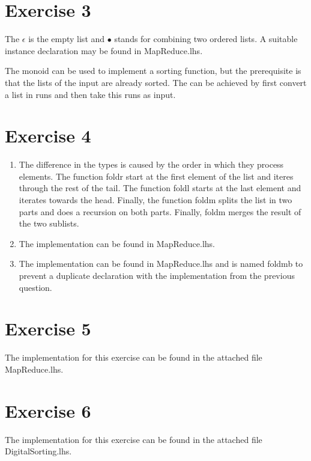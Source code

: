 \documentclass{article}
\begin{document}
\section*{Exercise 3}
The $\epsilon$ is the empty list and $\bullet$ stands for combining two ordered lists. A suitable instance declaration may be found in MapReduce.lhs.

The monoid can be used to implement a sorting function, but the prerequisite is that the lists of the input are already sorted. The can be achieved by first convert a list in runs and then take this runs as input.

\section*{Exercise 4}
\begin{enumerate}
  \item The difference in the types is caused by the order in which they process elements. The function foldr start at the first element of the list and iteres through the rest of the tail. The function foldl starts at the last element and iterates towards the head. Finally, the function foldm splits the list in two parts and does a recursion on both parts. Finally, foldm merges the result of the two sublists.
  \item The implementation can be found in MapReduce.lhs.
  \item The implementation can be found in MapReduce.lhs and is named foldmb to prevent a duplicate declaration with the implementation from the previous question.
\end{enumerate}
\section*{Exercise 5}
The implementation for this exercise can be found in the attached file MapReduce.lhs.
\section*{Exercise 6}
The implementation for this exercise can be found in the attached file DigitalSorting.lhs.
\end{document}
